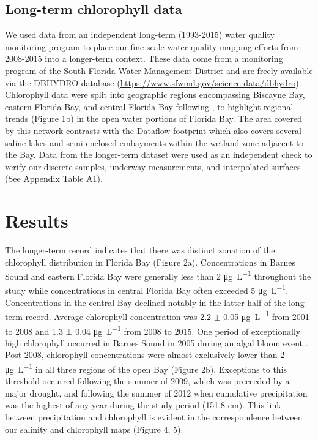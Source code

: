 \subsection{Long-term chlorophyll data}
\label{longtermchl}

We used data from an independent long-term (1993-2015) water quality monitoring program to place our fine-scale water quality mapping efforts from 2008-2015 into a longer-term context. These data come from a monitoring program of the South Florida Water Management District and are freely available via the DBHYDRO database (\href{https://www.sfwmd.gov/science-data/dbhydro}{https://www.sfwmd.gov/science-data/dbhydro}). Chlorophyll data were split into geographic regions encompassing Biscayne Bay, eastern Florida Bay, and central Florida Bay following \citet{boyer_seasonal_1999}, to highlight regional trends (Figure 1b) in the open water portions of Florida Bay. The area covered by this network contrasts with the Dataflow footprint which also covers several saline lakes and semi-enclosed embayments within the wetland zone adjacent to the Bay. Data from the longer-term dataset were used as an independent check to verify our discrete samples, underway measurements, and interpolated surfaces (See Appendix Table A1).

\section{Results}
\label{results}

The longer-term record indicates that there was distinct zonation of the chlorophyll distribution in Florida Bay (Figure 2a). Concentrations in Barnes Sound and eastern Florida Bay were generally less than 2 \si{\micro\gram\per\liter} throughout the study while concentrations in central Florida Bay often exceeded 5 \si{\micro\gram\per\liter}. Concentrations in the central Bay declined notably in the latter half of the long-term record. Average chlorophyll concentration was 2.2 $\pm$ 0.05 \si{\micro\gram\per\liter} from 2001 to 2008 and 1.3 $\pm$ 0.04 \si{\micro\gram\per\liter} from 2008 to 2015. One period of exceptionally high chlorophyll occurred in Barnes Sound in 2005 during an algal bloom event \citep{rudnick_2006}. Post-2008, chlorophyll concentrations were almost exclusively lower than 2 \si{\micro\gram\per\liter} in all three regions of the open Bay (Figure 2b). Exceptions to this threshold occurred following the summer of 2009, which was preceeded by a major drought, and following the summer of 2012 when cumulative precipitation was the highest of any year during the study period (151.8 cm). This link between precipitation and chlorophyll is evident in the correspondence between our salinity and chlorophyll maps (Figure 4, 5).  

